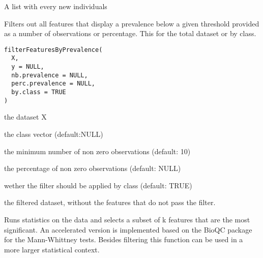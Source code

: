 \documentclass[a4paper]{book}
\begin{document}
%
\begin{Value}
A list with every new individuals
\end{Value}
%
\begin{Description}
Filters out all features that display a prevalence below a given threshold provided as a number of 
observations or percentage. This for the total dataset or by class.
\end{Description}
%
\begin{Usage}
\begin{verbatim}
filterFeaturesByPrevalence(
  X,
  y = NULL,
  nb.prevalence = NULL,
  perc.prevalence = NULL,
  by.class = TRUE
)
\end{verbatim}
\end{Usage}
%
\begin{Arguments}
\begin{ldescription}
\item[\code{X:}] the dataset X

\item[\code{y:}] the class vector (default:NULL)

\item[\code{nb.prevalence:}] the minimum number of non zero observations (default: 10)

\item[\code{perc.prevalence:}] the percentage of non zero observations (default: NULL)

\item[\code{by.class:}] wether the filter should be applied by class (default: TRUE)
\end{ldescription}
\end{Arguments}
%
\begin{Value}
the filtered dataset, without the features that do not pass the filter.
\end{Value}
%
\begin{Description}
Runs statistics on the data and selects a subset of k features that are the most significant. 
An accelerated version is implemented based on the BioQC package for the Mann-Whittney tests. Besides filtering 
this function can be used in a more larger statistical context.
\end{Description}
\end{document}
